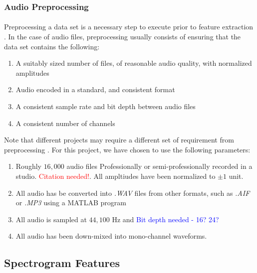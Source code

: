 \documentclass[12pt,letterpaper]{article}
\begin{document}

\subsubsection{Audio Preprocessing}
\label{subsubsec-Preprocessing}

\paragraph*{}Preprocessing a data set is a necessary step to execute prior to feature extraction \cite{Geron2,James}. In the case of audio files, preprocessing usually consists of ensuring that the data set contains the following:
\begin{enumerate}
\item A suitably sized number of files, of reasonable audio quality, with normalized amplitudes
\item Audio encoded in a standard, and consistent format
\item A consistent sample rate and bit depth between audio files
\item A consistent number of channels
\end{enumerate}
Note that different projects may require a different set of requirement from preprocessing \cite{Virtanen}. For this project, we have chosen to use the following parameters:
\begin{enumerate}
\item Roughly $16,000$ audio files Professionally or semi-professionally recorded in a studio. \textcolor{red}{Citation needed!}. All ampltiudes have been normalized to $\pm 1$ unit.
\item All audio has be converted into \textit{.WAV} files from other formats, such as \textit{.AIF} or \textit{.MP3} using a MATLAB program
\item All audio is sampled at $44,100$ Hz and \textcolor{blue}{Bit depth needed - 16? 24?}
\item All audio has been down-mixed into mono-channel waveforms.
\end{enumerate}


\newpage

\subsection{Spectrogram Features}
\label{subsec-spectrogram}
\end{document}
